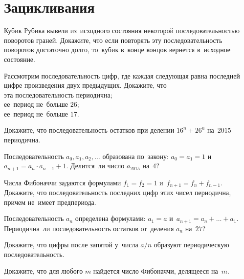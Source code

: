 
\section*{Зацикливания}


\begin{problems}

\item
Кубик Рубика вывели из~исходного состояния некоторой последовательностью
поворотов граней.
Докажите, что если повторять эту последовательность поворотов достаточно долго,
то~кубик в~конце концов вернется в~исходное состояние.

\item
Рассмотрим последовательность цифр, где каждая следующая равна последней цифре
произведения двух предыдущих.
Докажите, что
\\
\subproblem эта последовательность периодична;
\\
\subproblem ее~период не~больше $26$;
\\
\subproblem ее~период не~больше $17$.

\item
Докажите, что последовательность остатков при делении $16^n + 26^n$ на~$2015$
периодична.

\item
Последовательность $a_0, a_1, a_2,\ldots$ образована по~закону:
$a_0 = a_1 = 1$ и~ $a_{n + 1} = a_n \cdot a_{n - 1} + 1$.
Делится~ли число $a_{2015}$ на~$4$?

\item
Числа Фибоначчи задаются формулами
$f_1 = f_2 = 1$ и~$f_{n + 1} = f_n + f_{n - 1}$.
Докажите, что последовательность последних цифр этих чисел периодична, причем
не~имеет предпериода.

\item
Последовательность $a_n$ определена формулами:
$a_1 = a$ и~$a_{n + 1} = a_n + \ldots + a_1$.
Периодична~ли последовательность остатков от~деления $a_n$ на~$27$?

\item
Докажите, что цифры после запятой у~числа $a / n$ образуют периодическую
последовательность.

\item
Докажите, что для любого $m$ найдется число Фибоначчи, делящееся на~$m$.

\end{problems}


